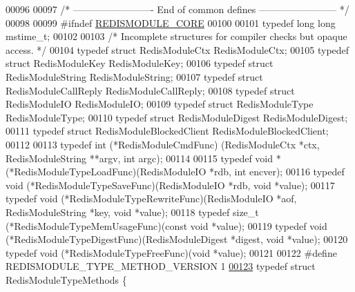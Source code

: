 \begin{DoxyCode}
00096 
00097 \textcolor{comment}{/* ------------------------- End of common defines ------------------------ */}
00098 
00099 \textcolor{preprocessor}{#}\textcolor{preprocessor}{ifndef} \hyperlink{module_8c_a1c891ed8ef2530fbaf7e418dfb43be63}{REDISMODULE\_CORE}
00100 
00101 \textcolor{keyword}{typedef} \textcolor{keywordtype}{long} \textcolor{keywordtype}{long} mstime\_t;
00102 
00103 \textcolor{comment}{/* Incomplete structures for compiler checks but opaque access. */}
00104 \textcolor{keyword}{typedef} \textcolor{keyword}{struct} RedisModuleCtx RedisModuleCtx;
00105 \textcolor{keyword}{typedef} \textcolor{keyword}{struct} RedisModuleKey RedisModuleKey;
00106 \textcolor{keyword}{typedef} \textcolor{keyword}{struct} RedisModuleString RedisModuleString;
00107 \textcolor{keyword}{typedef} \textcolor{keyword}{struct} RedisModuleCallReply RedisModuleCallReply;
00108 \textcolor{keyword}{typedef} \textcolor{keyword}{struct} RedisModuleIO RedisModuleIO;
00109 \textcolor{keyword}{typedef} \textcolor{keyword}{struct} RedisModuleType RedisModuleType;
00110 \textcolor{keyword}{typedef} \textcolor{keyword}{struct} RedisModuleDigest RedisModuleDigest;
00111 \textcolor{keyword}{typedef} \textcolor{keyword}{struct} RedisModuleBlockedClient RedisModuleBlockedClient;
00112 
00113 \textcolor{keyword}{typedef} \textcolor{keywordtype}{int} (*RedisModuleCmdFunc) (RedisModuleCtx *ctx, RedisModuleString **argv, \textcolor{keywordtype}{int} argc);
00114 
00115 \textcolor{keyword}{typedef} \textcolor{keywordtype}{void} *(*RedisModuleTypeLoadFunc)(RedisModuleIO *rdb, \textcolor{keywordtype}{int} encver);
00116 \textcolor{keyword}{typedef} \textcolor{keywordtype}{void} (*RedisModuleTypeSaveFunc)(RedisModuleIO *rdb, \textcolor{keywordtype}{void} *value);
00117 \textcolor{keyword}{typedef} \textcolor{keywordtype}{void} (*RedisModuleTypeRewriteFunc)(RedisModuleIO *aof, RedisModuleString *key, \textcolor{keywordtype}{void} *value);
00118 \textcolor{keyword}{typedef} size\_t (*RedisModuleTypeMemUsageFunc)(\textcolor{keyword}{const} \textcolor{keywordtype}{void} *value);
00119 \textcolor{keyword}{typedef} \textcolor{keywordtype}{void} (*RedisModuleTypeDigestFunc)(RedisModuleDigest *digest, \textcolor{keywordtype}{void} *value);
00120 \textcolor{keyword}{typedef} \textcolor{keywordtype}{void} (*RedisModuleTypeFreeFunc)(\textcolor{keywordtype}{void} *value);
00121 
00122 \textcolor{preprocessor}{#}\textcolor{preprocessor}{define} \textcolor{preprocessor}{REDISMODULE\_TYPE\_METHOD\_VERSION} 1
\hyperlink{structRedisModuleTypeMethods}{00123} \textcolor{keyword}{typedef} \textcolor{keyword}{struct} RedisModuleTypeMethods \{

\end{DoxyCode}
